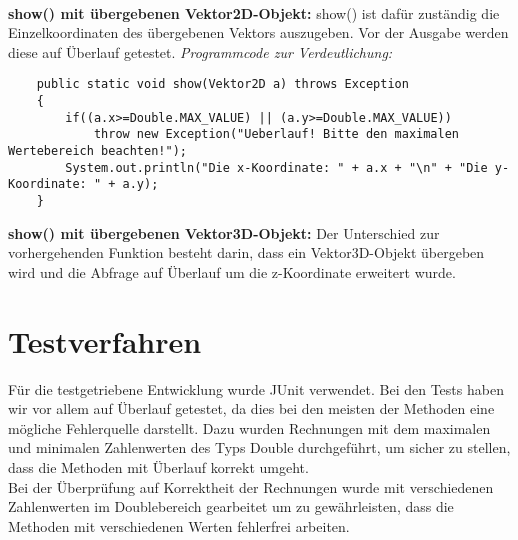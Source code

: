 \documentclass[a4paper,11pt]{scrartcl}
\begin{document}
\\
\textbf{show() mit übergebenen Vektor2D-Objekt:} show() ist dafür zuständig die Einzelkoordinaten des übergebenen Vektors auszugeben. Vor der Ausgabe werden diese auf Überlauf getestet.
\textit{Programmcode zur Verdeutlichung:}
\begin{lstlisting}
	public static void show(Vektor2D a) throws Exception
	{
		if((a.x>=Double.MAX_VALUE) || (a.y>=Double.MAX_VALUE))
			throw new Exception("Ueberlauf! Bitte den maximalen Wertebereich beachten!");
		System.out.println("Die x-Koordinate: " + a.x + "\n" + "Die y-Koordinate: " + a.y);
	}
\end{lstlisting} $\;$ \\
\textbf{show() mit übergebenen Vektor3D-Objekt:} Der Unterschied zur vorhergehenden Funktion besteht darin, dass ein Vektor3D-Objekt übergeben wird und die Abfrage auf Überlauf um die z-Koordinate erweitert wurde.\\
\section{Testverfahren}
Für die testgetriebene Entwicklung wurde JUnit verwendet. Bei den Tests haben wir vor allem auf Überlauf getestet, da dies bei den meisten der Methoden eine mögliche Fehlerquelle darstellt. Dazu wurden Rechnungen mit dem maximalen und minimalen Zahlenwerten des Typs Double durchgeführt, um sicher zu stellen, dass die Methoden mit Überlauf korrekt umgeht. 
\\
Bei der Überprüfung auf Korrektheit der Rechnungen wurde mit verschiedenen Zahlenwerten im Doublebereich gearbeitet um zu gewährleisten, dass die Methoden mit verschiedenen Werten fehlerfrei arbeiten. 
\end{document}
